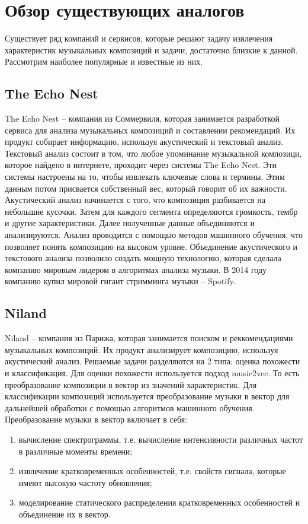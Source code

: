 \section{Обзор существующих аналогов}
\label{sec:analogues}

Существует ряд компаний и сервисов, которые решают задачу извлечения характеристик музыкальных композиций и задачи, достаточно близкие к данной. Рассмотрим наиболее популярные и известные из них.

\subsection{The Echo Nest}
\label{sec:analogues:ten}
The Echo Nest -- компания из Соммервиля, которая занимается разработкой сервиса для анализа музыкальных композиций и составлении рекомендаций. Их продукт собирает информацию, используя акустический и текстовый анализ. Текстовый анализ состоит в том, что любое упоминание музыкальной композици, которое найдено в интернете, проходит через системы The Echo Nest. Эти системы настроены на то, чтобы извлекать ключевые слова и термины. Этим данным потом присвается собственный вес, который говорит об их важности. Акустический анализ начинается с того, что композиция разбивается на небольшие кусочки. Затем для каждого сегмента определяются громкость, тембр и другие характеристики. Далее полученные данные объединяются и анализируются. Анализ проводится с помощью методов машинного обучения, что позволяет понять композицию на высоком уровне. Объединение акустического и текстового анализа позволило создать мощную технологию, которая сделала компанию мировым лидером в алгоритмах анализа музыки. В 2014 году компанию купил мировой гигант стримминга музыки -- Spotify.

\subsection{Niland}
\label{sec:analogues:niland}
Niland -- компания из Парижа, которая занимается поиском и реккомендациями музыкальных композиций. Их продукт анализирует композицию, используя акустический анализ. Решаемые задачи разделяются на 2 типа: оценка похожести и классификация. Для оценки похожести используется подход music2vec. То есть преобразование композиции в вектор из значений характеристик. Для классификации композиций используется преобразование музыки в вектор для дальнейшей обработки с помощью алгоритмов машинного обучения. Преобразование музыки в вектор включает в себя:
\begin{enumerate}
    \item вычисление спектрограммы, т.е. вычисление интенсивности различных частот в различные моменты времени;
    \item извлечение кратковременных особенностей, т.е. свойств сигнала, \linebreak которые имеют высокую частоту обновления;
    \item моделирование статического распределения кратковременных особенностей и объединение их в вектор.
\end{enumerate}


